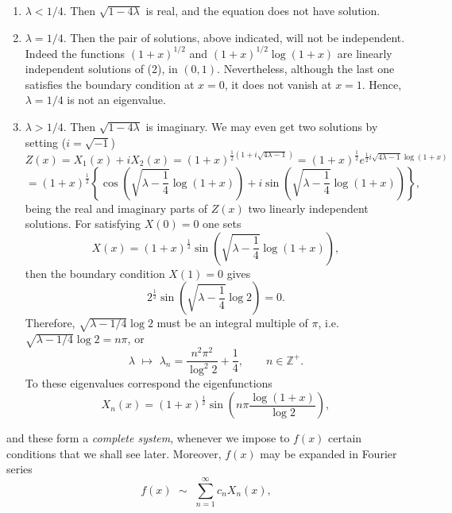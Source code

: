 \documentclass[12pt]{article}
\begin{document}
\begin{enumerate}
\item $\lambda<1/4$. Then $\sqrt{1-4\lambda}$ is real, and the equation does not have solution.
\item $\lambda=1/4$. Then the pair of solutions, above indicated, will not be independent. Indeed the functions $(1+x)^{1/2}$ and  $(1+x)^{1/2}\log(1+x)$ are linearly independent solutions of (2), in $(0,1)$. Nevertheless, although the last one satisfies the boundary condition at $x=0$, it does not vanish at $x=1$. Hence, $\lambda=1/4$ is not an eigenvalue.
\item $\lambda>1/4$. Then $\sqrt{1-4\lambda}$ is imaginary. We may even get two solutions by setting ($i=\sqrt{-1}$)
\begin{equation*}
Z(x)=X_1(x)+iX_2(x)=(1+x)^{\frac{1}{2}(1+i\sqrt{4\lambda-1})}=
(1+x)^{\frac{1}{2}}e^{\frac{1}{2}i\sqrt{4\lambda-1}\log(1+x)}
\end{equation*}
\begin{equation*}
=(1+x)^{\frac{1}{2}}\left\{\cos\left(\sqrt{\lambda-\frac{1}{4}}\log(1+x)\right)+
i\sin\left(\sqrt{\lambda-\frac{1}{4}}\log(1+x)\right)\right\},
\end{equation*}
being  the real and imaginary parts of $Z(x)$ two linearly independent solutions. For satisfying $X(0)=0$ one sets
\begin{equation*}
X(x)=(1+x)^{\frac{1}{2}}\sin\left(\sqrt{\lambda-\frac{1}{4}}\log(1+x)\right),
\end{equation*}
then the boundary condition $X(1)=0$ gives
\begin{equation*}
2^{\frac{1}{2}}\sin\left(\sqrt{\lambda-\frac{1}{4}}\log 2\right)=0.
\end{equation*}
Therefore, $\sqrt{\lambda-1/4}\log 2$ must be an integral multiple of $\pi$, i.e. $\sqrt{\lambda-1/4}\log 2=n\pi$, or
\begin{equation*}
\lambda\,\,\mapsto\,\, \lambda_n=\frac{n^2\pi^2}{\log^2 2}+\frac{1}{4}, \qquad n\in\mathbb{Z}^+.
\end{equation*} 
To these eigenvalues correspond the eigenfunctions
\begin{equation*}
X_n(x)=(1+x)^{\frac{1}{2}}\sin\left(n\pi\frac{\log(1+x)}{\log 2}\right),
\end{equation*}
\end{enumerate}
and these form a \emph{complete system}, whenever we impose to $f(x)$ certain conditions that we  shall see later. Moreover, $f(x)$ may be expanded in Fourier series
\begin{equation*}
f(x)\,\, \sim\,\, \sum_{n=1}^{\infty}c_n X_n(x),
\end{equation*}
\end{document}
